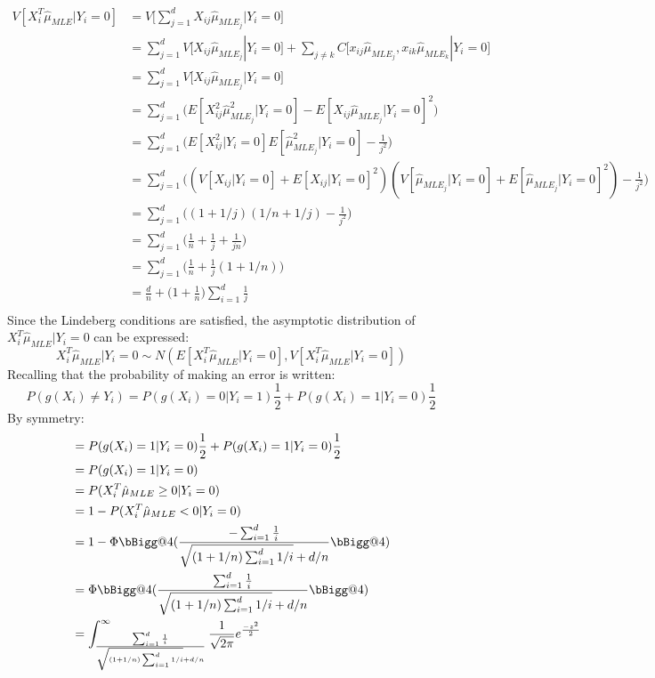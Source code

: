 \documentclass{article}
\makeatletter
\newcommand{\hella}{\bBigg@{4}}
\makeatother
\begin{document}
  \begin{align*}
    V[X_i^T \hat \mu_{MLE} | Y_i=0] &= V\bigg[\sum_{j=1}^d X_{ij} \hat \mu_{MLE_j} | Y_i=0 \bigg]\\
    &= \sum_{j=1}^d V\bigg[X_{ij} \hat \mu_{MLE_j} | Y_i=0 \bigg] + \sum_{j\neq k} C\bigg[x_{ij}\hat \mu_{MLE_j}, x_{ik} \hat \mu_{MLE_k} | Y_i=0\bigg]\\
    &= \sum_{j=1}^d V\bigg[X_{ij} \hat \mu_{MLE_j} | Y_i = 0\bigg]\\
    &= \sum_{j=1}^d \bigg(E[X_{ij}^2 \hat \mu_{MLE_j}^2 | Y_i=0] - E[X_{ij} \hat \mu_{MLE_j} | Y_i=0]^2\bigg) \\
    &= \sum_{j=1}^d \bigg(E[X_{ij}^2 | Y_i=0] E[\hat \mu_{MLE_j}^2 |Y_i=0] - \frac{1}{j^2}\bigg) \\
    &= \sum_{j=1}^d \bigg((V[X_{ij} | Y_i=0]+E[X_{ij} | Y_i=0]^2) (V[\hat \mu_{MLE_j} | Y_i=0] + E[\hat \mu_{MLE_j}|Y_i=0]^2) - \frac{1}{j^2}\bigg) \\
    &= \sum_{j=1}^d \bigg((1+1/j)(1/n+ 1/j) - \frac{1}{j^2}\bigg) \\
    &= \sum_{j=1}^d \bigg(\frac{1}{n} + \frac{1}{j} + \frac{1}{jn}\bigg)\\
    &= \sum_{j=1}^d \bigg(\frac{1}{n} + \frac{1}{j}(1+1/n)\bigg)\\
    &= \frac{d}{n} + \bigg(1 + \frac{1}{n}\bigg)\sum_{i=1}^d \frac{1}{j}\\
  \end{align*}
  Since the Lindeberg conditions are satisfied, the asymptotic distribution of  $X^T_i \hat \mu_{MLE} | Y_i=0$ can be expressed:
  $$X^T_i \hat \mu_{MLE} | Y_i =0\sim N(E[X^T_i \hat \mu_{MLE} | Y_i=0], V[X^T_i \hat \mu_{MLE} | Y_i=0])$$
  Recalling that the probability of making an error is written:
  $$P(g(X_i) \neq Y_i) = P(g(X_i)=0 | Y_i=1) \frac{1}{2} + P(g(X_i)=1|Y_i=0) \frac{1}{2}$$
  By symmetry:
  \begin{align*}
    &= P(g(X_i)=1 | Y_i=0) \frac{1}{2} + P(g(X_i)=1|Y_i=0) \frac{1}{2}\\
    &= P(g(X_i)=1 | Y_i=0)\\
    &= P(X^T_i \hat \mu_{MLE} \geq 0| Y_i=0)\\
    &= 1 - P(X^T_i \hat \mu_{MLE} < 0| Y_i=0)\\
    &= 1 - \Phi\hella(\frac{-\sum_{i=1}^d \frac{1}{i}}{\sqrt{(1+1/n)\sum_{i=1}^d 1/i} + d/n}\hella)\\
    &=  \Phi\hella(\frac{\sum_{i=1}^d \frac{1}{i}}{\sqrt{(1+1/n)\sum_{i=1}^d 1/i} + d/n}\hella)\\
    &=  \int_{ \frac{\sum_{i=1}^d \frac{1}{i}}{\sqrt{(1+1/n)\sum_{i=1}^d 1/i} + d/n}}^{\infty} \frac{1}{\sqrt{2 \pi}}e^{\frac{-z^2}{2}}\\
  \end{align*}
\end{document}
